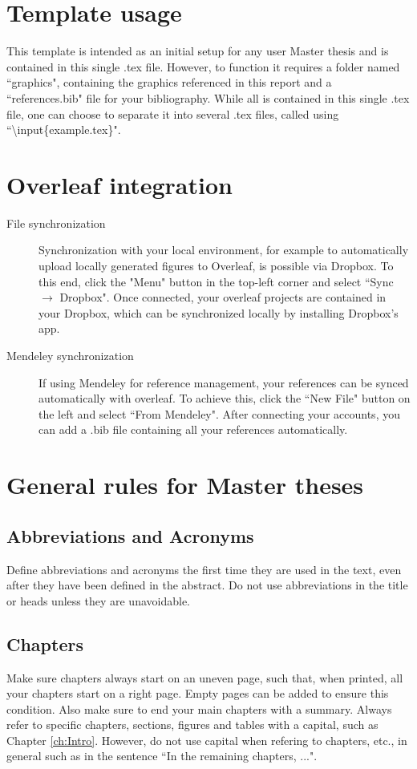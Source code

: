 \documentclass[11pt]{report}
\numberwithin{equation}{chapter}		%
\numberwithin{figure}{chapter}			%
\numberwithin{table}{chapter}			%
\begin{document}
\section{Template usage}
This template is intended as an initial setup for any user Master thesis and is contained in this single .tex file. However, to function it requires a folder named ``graphics", containing the graphics referenced in this report and a ``references.bib" file for your bibliography. While all is contained in this single .tex file, one can choose to separate it into several .tex files, called using ``\textbackslash{}input\{example.tex\}".

\section{Overleaf integration}
\begin{description}
\item[File synchronization] Synchronization with your local environment, for example to automatically upload locally generated figures to Overleaf, is possible via Dropbox. To this end, click the "Menu" button in the top-left corner and select ``Sync $\rightarrow$ Dropbox". Once connected, your overleaf projects are contained in your Dropbox, which can be synchronized locally by installing Dropbox's app.
\item[Mendeley synchronization] If using Mendeley for reference management, your references can be synced automatically with overleaf. To achieve this, click the ``New File" button on the left and select ``From Mendeley". After connecting your accounts, you can add a .bib file containing all your references automatically.
\end{description}


\section{General rules for Master theses}
\subsection{Abbreviations and Acronyms} Define abbreviations and acronyms the first time they are used in the text, even after they have been defined in the abstract. Do not use abbreviations in the title or heads unless they are unavoidable.

\subsection{Chapters}
Make sure chapters always start on an uneven page, such that, when printed, all your chapters start on a right page. Empty pages can be added to ensure this condition. Also make sure to end your main chapters with a summary. Always refer to specific chapters, sections, figures and tables with a capital, such as Chapter \ref{ch:Intro}. However, do not use capital when refering to chapters, etc., in general such as in the sentence ``In the remaining chapters, ...".
\end{document}
